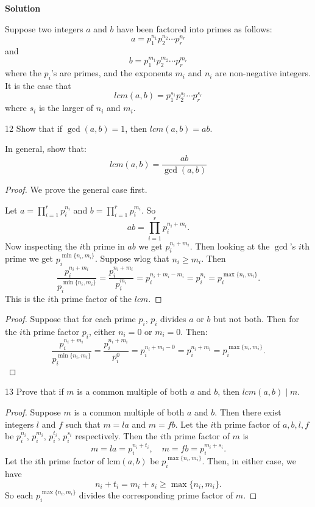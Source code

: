 \textbf{Solution}

Suppose two integers $a$ and $b$ have been factored into primes as follows:
\[a = p_1^{n_1} p_2^{n_2} \cdots p_r^{n_r}\]
and 
\[b = p_1^{m_1} p_2^{m_2} \cdots p_r^{m_r}\]
where the $p_i$'s are primes, and the exponents $m_i$ and $n_i$ are non-negative 
integers. It is the case that 
\[lcm(a, b) = p_1^{s_1} p_2^{s_2} \cdots p_r^{s_r}\]
where $s_i$ is the larger of $n_i$ and $m_i$.

\begin{problem}{12}
    Show that if $\gcd(a, b) = 1$, then $lcm(a, b) = ab$.

    In general, show that:
    \[lcm(a, b) = \frac{ab}{\gcd(a, b)}\]
\end{problem}
\solved

\begin{proof}
    We prove the general case first.

    Let $a = \prod_{i=1}^r p_i^{n_i}$ and $b = \prod_{i=1}^r p_i^{m_i}$.
    So 
    \[
        ab = \prod_{i=1}^r p_i^{n_i+m_i}.
    \]
    Now inspecting the $i$th prime in $ab$ we get $p_i^{n_i + m_i}$.
    Then looking at the $\operatorname{\gcd}$'s $i$th prime we get $p_i^{\min\{n_i, m_i\}}$.
    Suppose wlog that $n_i \geq m_i$.
    Then 
    \[
        \frac{p_i^{n_i + m_i}}{p_i^{\min\{n_i, m_i\}}} 
        = \frac{p_i^{n_i + m_i}}{p_i^{m_i}}
        = p_i^{n_i + m_i - m_i}
        = p_i^{n_i}
        = p_i^{\max\{n_i, m_i\}}.
    \]
    This is the $i$th prime factor of the $lcm$.
\end{proof}

\begin{proof}
    Suppose that for each prime $p_i$, $p_i$ divides $a$ or $b$ but not both.  
    Then for the $i$th prime factor $p_i$, either $n_i = 0$ or $m_i = 0$. 
    Then:
    \[
        \frac{p_i^{n_i + m_i}}{p_i^{\min\{n_i, m_i\}}} 
        = \frac{p_i^{n_i + m_i}}{p_i^0}
        = p_i^{n_i + m_i - 0}
        = p_i^{n_i + m_i}
        = p_i^{\max\{n_i, m_i\}}.
    \]
\end{proof}

\begin{problem}{13}
    Prove that if $m$ is a common multiple of both $a$ and $b$, then 
    $lcm(a, b) \mid m$.
\end{problem}
\solved

\begin{proof}
Suppose $m$ is a common multiple of both $a$ and $b$.
Then there exist integers $l$ and $f$ such that $m = la$ and $m = fb$.
Let the $i$th prime factor of $a, b, l, f$ be 
    $p_i^{n_i}$, $p_i^{m_i}$, $p_i^{t_i}$, $p_i^{s_i}$ respectively.
Then the $i$th prime factor of $m$ is
\[
m = la = p_i^{n_i+t_i}, \quad
m = fb = p_i^{m_i+s_i}.
\]
Let the $i$th prime factor of $\mathrm{lcm}(a,b)$ be $p_i^{\max\{n_i,m_i\}}$.
Then, in either case, we have
\[
n_i+t_i = m_i+s_i \ge \max\{n_i,m_i\}.
\]
So each $p_i^{\max\{n_i,m_i\}}$ divides the corresponding prime factor of $m$.
\end{proof}

